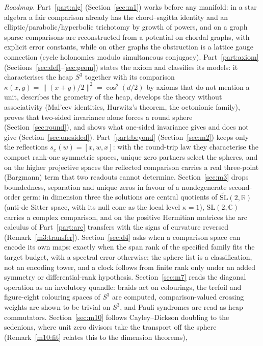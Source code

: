 \documentclass[11pt,reqno]{amsart}
\theoremstyle{definition}
\theoremstyle{remark}
\numberwithin{equation}{section}
\newcommand{\R}{\mathbb{R}}
\newcommand{\C}{\mathbb{C}}
\newcommand{\hp}[3]{[#1,#2,#3]}
\begin{document}
\emph{Roadmap.}  Part~\ref{part:alg} (Section~\ref{sec:m1}) works before any manifold: in a star algebra a fair comparison already
has the chord--sagitta identity and an elliptic/parabolic/hyperbolic trichotomy by growth of powers, and on a graph sparse
comparisons are reconstructed from a potential on chordal graphs, with explicit error constants, while on other graphs the
obstruction is a lattice gauge connection (cycle holonomies modulo simultaneous conjugacy).  Part~\ref{part:axiom}
(Sections~\ref{sec:def}--\ref{sec:geom}) states the axiom and classifies its models: it
characterises the heap $S^3$ together with its comparison $\kappa(x,y)=\lVert (x+y)/2\rVert^2=\cos^2(d/2)$ by axioms that do not mention a
unit, describes the geometry of the heap, develops the theory without associativity (Mal'cev identities, Hurwitz's theorem, the
octonionic family), proves that two-sided invariance alone forces a round sphere (Section~\ref{sec:round}), and shows what one-sided
invariance gives and does not give (Section~\ref{sec:onesided}).  Part~\ref{part:beyond} (Section~\ref{sec:m2}) keeps only the reflections
$s_x(w)=\hp xwx$: with the round-trip law they characterise the compact rank-one symmetric spaces, unique zero partners select the spheres,
and on the higher projective spaces the reflected comparison carries a real three-point (Bargmann) term that two readouts cannot
determine.  Section~\ref{sec:m3} drops boundedness, separation and unique zeros in favour of a nondegenerate second-order germ: in
dimension three the solutions are central quotients of $\widetilde{\mathrm{SL}}(2,\R)$ (anti-de Sitter space, with its null cone as the
local level $\kappa=1$), $\mathrm{SL}(2,\C)$ carries a complex comparison, and on the positive Hermitian matrices the arc calculus of
Part~\ref{part:arc} transfers with the signs of curvature reversed (Remark~\ref{m3:transfer}).  Section~\ref{sec:d4} asks when a
comparison space can encode its own maps: exactly when the span rank of the specified family fits the target budget, with a spectral
error otherwise; the sphere list is a classification, not an encoding tower, and a clock follows from finite rank only under an added
symmetry or differential-rank hypothesis.  Section~\ref{sec:m7} reads the diagonal operation as an involutory quandle: braids act on
colourings, the trefoil and figure-eight colouring spaces of $S^3$ are computed, comparison-valued crossing weights are shown to be
trivial on $S^3$, and Pauli syndromes are read as heap commutators.  Section~\ref{sec:m10} follows Cayley--Dickson doubling to the
sedenions, where unit zero divisors take the transport off the sphere (Remark~\ref{m10:fit} relates this to the dimension theorems),
\end{document}
